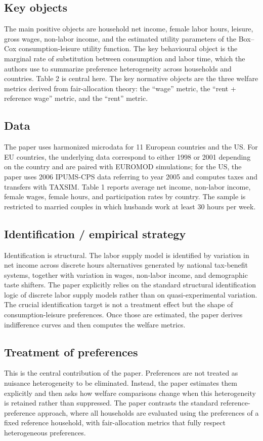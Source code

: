 \documentclass[11pt,a4paper]{article}
\begin{document}
\subsection*{Key objects}
The main positive objects are household net income, female labor hours, leisure, gross wages, non-labor income, and the estimated utility parameters of the Box–Cox consumption-leisure utility function. The key behavioural object is the marginal rate of substitution between consumption and labor time, which the authors use to summarize preference heterogeneity across households and countries. Table 2 is central here. The key normative objects are the three welfare metrics derived from fair-allocation theory: the “wage” metric, the “rent + reference wage” metric, and the “rent” metric.

\subsection*{Data}
The paper uses harmonized microdata for 11 European countries and the US. For EU countries, the underlying data correspond to either 1998 or 2001 depending on the country and are paired with EUROMOD simulations; for the US, the paper uses 2006 IPUMS-CPS data referring to year 2005 and computes taxes and transfers with TAXSIM. Table 1 reports average net income, non-labor income, female wages, female hours, and participation rates by country. The sample is restricted to married couples in which husbands work at least 30 hours per week.

\subsection*{Identification / empirical strategy}
Identification is structural. The labor supply model is identified by variation in net income across discrete hours alternatives generated by national tax-benefit systems, together with variation in wages, non-labor income, and demographic taste shifters. The paper explicitly relies on the standard structural identification logic of discrete labor supply models rather than on quasi-experimental variation. The crucial identification target is not a treatment effect but the shape of consumption-leisure preferences. Once those are estimated, the paper derives indifference curves and then computes the welfare metrics.

\subsection*{Treatment of preferences}
This is the central contribution of the paper. Preferences are not treated as nuisance heterogeneity to be eliminated. Instead, the paper estimates them explicitly and then asks how welfare comparisons change when this heterogeneity is retained rather than suppressed. The paper contrasts the standard reference-preference approach, where all households are evaluated using the preferences of a fixed reference household, with fair-allocation metrics that fully respect heterogeneous preferences.
\end{document}
